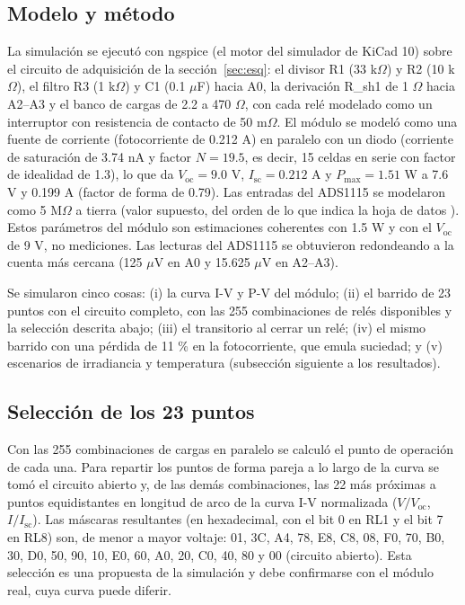 \documentclass[10pt,letterpaper,twocolumn]{article}
\begin{document}
\subsection{Modelo y método}
La simulación se ejecutó con ngspice (el motor del simulador de KiCad 10) sobre el circuito de adquisición de la sección~\ref{sec:esq}: el divisor R1 (33 k$\Omega$) y R2 (10 k$\Omega$), el filtro R3 (1 k$\Omega$) y C1 (0.1 $\mu$F) hacia A0, la derivación R\_sh1 de 1 $\Omega$ hacia A2--A3 y el banco de cargas de 2.2 a 470 $\Omega$, con cada relé modelado como un interruptor con resistencia de contacto de 50 m$\Omega$. El módulo se modeló como una fuente de corriente (fotocorriente de 0.212 A) en paralelo con un diodo (corriente de saturación de 3.74 nA y factor $N=19.5$, es decir, 15 celdas en serie con factor de idealidad de 1.3), lo que da $V_\mathrm{oc}=9.0$ V, $I_\mathrm{sc}=0.212$ A y $P_\mathrm{max}=1.51$ W a 7.6 V y 0.199 A (factor de forma de 0.79). Las entradas del ADS1115 se modelaron como 5 M$\Omega$ a tierra (valor supuesto, del orden de lo que indica la hoja de datos \cite{ads1115}). Estos parámetros del módulo son estimaciones coherentes con 1.5 W y con el $V_\mathrm{oc}$ de 9 V, no mediciones. Las lecturas del ADS1115 se obtuvieron redondeando a la cuenta más cercana (125 $\mu$V en A0 y 15.625 $\mu$V en A2--A3).

Se simularon cinco cosas: (i) la curva I-V y P-V del módulo; (ii) el barrido de 23 puntos con el circuito completo, con las 255 combinaciones de relés disponibles y la selección descrita abajo; (iii) el transitorio al cerrar un relé; (iv) el mismo barrido con una pérdida de 11 \% en la fotocorriente, que emula suciedad; y (v) escenarios de irradiancia y temperatura (subsección siguiente a los resultados).

\subsection{Selección de los 23 puntos}
Con las 255 combinaciones de cargas en paralelo se calculó el punto de operación de cada una. Para repartir los puntos de forma pareja a lo largo de la curva se tomó el circuito abierto y, de las demás combinaciones, las 22 más próximas a puntos equidistantes en longitud de arco de la curva I-V normalizada ($V/V_\mathrm{oc}$, $I/I_\mathrm{sc}$). Las máscaras resultantes (en hexadecimal, con el bit 0 en RL1 y el bit 7 en RL8) son, de menor a mayor voltaje: 01, 3C, A4, 78, E8, C8, 08, F0, 70, B0, 30, D0, 50, 90, 10, E0, 60, A0, 20, C0, 40, 80 y 00 (circuito abierto). Esta selección es una propuesta de la simulación y debe confirmarse con el módulo real, cuya curva puede diferir.
\end{document}
